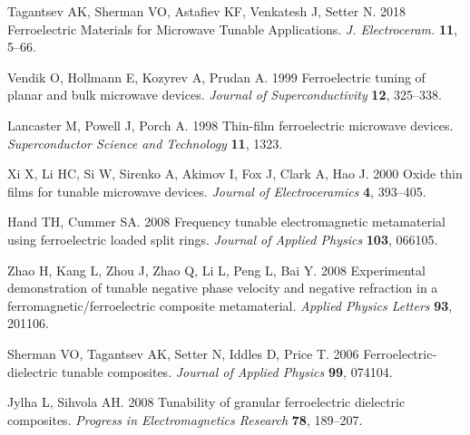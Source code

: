 \documentclass[%
 aip,
 amsmath,amssymb,
 reprint,%
]{revtex4-1}
\begin{document}






\vskip2pc

\begin{thebibliography}{99}

Tagantsev AK, Sherman VO, Astafiev KF, Venkatesh J, Setter N. 2018
  Ferroelectric {Materials} for {Microwave} {Tunable} {Applications}. {\em J.
  Electroceram.} \textbf{11}, 5--66.

Vendik O, Hollmann E, Kozyrev A, Prudan A. 1999  Ferroelectric tuning of planar
  and bulk microwave devices. {\em Journal of Superconductivity} \textbf{12},
  325--338.

Lancaster M, Powell J, Porch A. 1998  Thin-film ferroelectric microwave
  devices. {\em Superconductor Science and Technology} \textbf{11}, 1323.

Xi X, Li HC, Si W, Sirenko A, Akimov I, Fox J, Clark A, Hao J. 2000  Oxide thin
  films for tunable microwave devices. {\em Journal of Electroceramics}
  \textbf{4}, 393--405.

Hand TH, Cummer SA. 2008  Frequency tunable electromagnetic metamaterial using
  ferroelectric loaded split rings. {\em Journal of Applied Physics}
  \textbf{103}, 066105.

Zhao H, Kang L, Zhou J, Zhao Q, Li L, Peng L, Bai Y. 2008  Experimental
  demonstration of tunable negative phase velocity and negative refraction in a
  ferromagnetic/ferroelectric composite metamaterial. {\em Applied Physics
  Letters} \textbf{93}, 201106.

Sherman VO, Tagantsev AK, Setter N, Iddles D, Price T. 2006
  Ferroelectric-dielectric tunable composites. {\em Journal of Applied Physics}
  \textbf{99}, 074104.

Jylha L, Sihvola AH. 2008  Tunability of granular ferroelectric dielectric
  composites. {\em Progress in Electromagnetics Research} \textbf{78},
  189--207.


\end{thebibliography}
\end{document}
